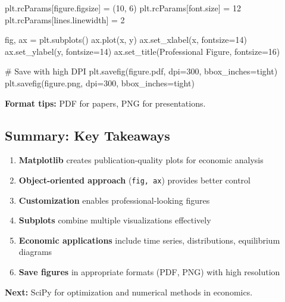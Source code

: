 \documentclass[
  letterpaper,
  DIV=11,
  numbers=noendperiod]{scrartcl}
\newenvironment{Shaded}{\begin{snugshade}}{\end{snugshade}}
\newcommand{\CommentTok}[1]{\textcolor[rgb]{0.37,0.37,0.37}{#1}}
\newcommand{\DecValTok}[1]{\textcolor[rgb]{0.68,0.00,0.00}{#1}}
\newcommand{\NormalTok}[1]{\textcolor[rgb]{0.00,0.23,0.31}{#1}}
\newcommand{\OperatorTok}[1]{\textcolor[rgb]{0.37,0.37,0.37}{#1}}
\newcommand{\StringTok}[1]{\textcolor[rgb]{0.13,0.47,0.30}{#1}}
\providecommand{\tightlist}{%
  \setlength{\itemsep}{0pt}\setlength{\parskip}{0pt}}
\begin{document}
\begin{Shaded}
\begin{Highlighting}[]
\NormalTok{plt.rcParams[}\StringTok{\textquotesingle{}figure.figsize\textquotesingle{}}\NormalTok{] }\OperatorTok{=}\NormalTok{ (}\DecValTok{10}\NormalTok{, }\DecValTok{6}\NormalTok{)}
\NormalTok{plt.rcParams[}\StringTok{\textquotesingle{}font.size\textquotesingle{}}\NormalTok{] }\OperatorTok{=} \DecValTok{12}
\NormalTok{plt.rcParams[}\StringTok{\textquotesingle{}lines.linewidth\textquotesingle{}}\NormalTok{] }\OperatorTok{=} \DecValTok{2}

\NormalTok{fig, ax }\OperatorTok{=}\NormalTok{ plt.subplots()}
\NormalTok{ax.plot(x, y)}
\NormalTok{ax.set\_xlabel(}\StringTok{\textquotesingle{}x\textquotesingle{}}\NormalTok{, fontsize}\OperatorTok{=}\DecValTok{14}\NormalTok{)}
\NormalTok{ax.set\_ylabel(}\StringTok{\textquotesingle{}y\textquotesingle{}}\NormalTok{, fontsize}\OperatorTok{=}\DecValTok{14}\NormalTok{)}
\NormalTok{ax.set\_title(}\StringTok{\textquotesingle{}Professional Figure\textquotesingle{}}\NormalTok{, fontsize}\OperatorTok{=}\DecValTok{16}\NormalTok{)}

\CommentTok{\# Save with high DPI}
\NormalTok{plt.savefig(}\StringTok{\textquotesingle{}figure.pdf\textquotesingle{}}\NormalTok{, dpi}\OperatorTok{=}\DecValTok{300}\NormalTok{, bbox\_inches}\OperatorTok{=}\StringTok{\textquotesingle{}tight\textquotesingle{}}\NormalTok{)}
\NormalTok{plt.savefig(}\StringTok{\textquotesingle{}figure.png\textquotesingle{}}\NormalTok{, dpi}\OperatorTok{=}\DecValTok{300}\NormalTok{, bbox\_inches}\OperatorTok{=}\StringTok{\textquotesingle{}tight\textquotesingle{}}\NormalTok{)}
\end{Highlighting}
\end{Shaded}

\textbf{Format tips:} PDF for papers, PNG for presentations.

\subsection{Summary: Key Takeaways}\label{summary-key-takeaways}

\begin{enumerate}
\def\labelenumi{\arabic{enumi}.}
\tightlist
\item
  \textbf{Matplotlib} creates publication-quality plots for economic
  analysis
\item
  \textbf{Object-oriented approach} (\texttt{fig,\ ax}) provides better
  control
\item
  \textbf{Customization} enables professional-looking figures
\item
  \textbf{Subplots} combine multiple visualizations effectively
\item
  \textbf{Economic applications} include time series, distributions,
  equilibrium diagrams
\item
  \textbf{Save figures} in appropriate formats (PDF, PNG) with high
  resolution
\end{enumerate}

\textbf{Next:} SciPy for optimization and numerical methods in
economics.
\end{document}
